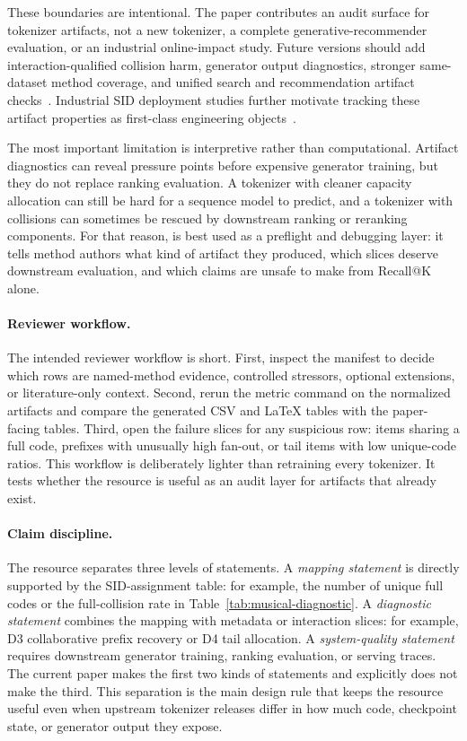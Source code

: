 These boundaries are intentional. The paper contributes an audit surface for
tokenizer artifacts, not a new \sid tokenizer, a complete
generative-recommender evaluation, or an industrial online-impact study.
Future versions should add interaction-qualified collision harm, generator
output diagnostics, stronger same-dataset method coverage, and unified search
and recommendation artifact checks~\cite{penha2025jointsid}. Industrial SID
deployment studies further motivate tracking these artifact properties as
first-class engineering objects~\cite{ju2026snapchatsid}.

The most important limitation is interpretive rather than computational.
Artifact diagnostics can reveal pressure points before expensive generator
training, but they do not replace ranking evaluation. A tokenizer with cleaner
capacity allocation can still be hard for a sequence model to predict, and a
tokenizer with collisions can sometimes be rescued by downstream ranking or
reranking components. For that reason, \tool is best used as a preflight and
debugging layer: it tells method authors what kind of artifact they produced,
which slices deserve downstream evaluation, and which claims are unsafe to make
from Recall@K alone.

\paragraph{Reviewer workflow.}
The intended reviewer workflow is short. First, inspect the manifest to decide
which rows are named-method evidence, controlled stressors, optional
extensions, or literature-only context. Second, rerun the metric command on the
normalized artifacts and compare the generated CSV and \LaTeX{} tables with
the paper-facing tables. Third, open the failure slices for any suspicious row:
items sharing a full code, prefixes with unusually high fan-out, or tail items
with low unique-code ratios. This workflow is deliberately lighter than
retraining every tokenizer. It tests whether the resource is useful as an audit
layer for artifacts that already exist.

\paragraph{Claim discipline.}
The resource separates three levels of statements. A \emph{mapping statement}
is directly supported by the SID-assignment table: for example, the number of
unique full codes or the full-collision rate in
Table~\ref{tab:musical-diagnostic}. A \emph{diagnostic statement} combines the
mapping with metadata or interaction slices: for example, D3 collaborative
prefix recovery or D4 tail allocation. A \emph{system-quality statement}
requires downstream generator training, ranking evaluation, or serving traces.
The current paper makes the first two kinds of statements and explicitly does
not make the third. This separation is the main design rule that keeps the
resource useful even when upstream tokenizer releases differ in how much code,
checkpoint state, or generator output they expose.

